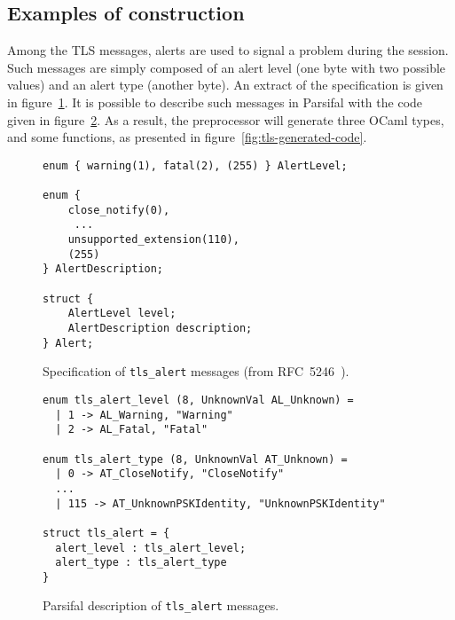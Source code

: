 \documentclass{article}
\begin{document}
\subsection{Examples of construction}

Among the TLS messages, alerts are used to signal a problem during the
session. Such messages are simply composed of an alert level (one byte
with two possible values) and an alert type (another byte). An extract
of the specification is given in figure~\ref{fig:tls-spec}. It is
possible to describe such messages in Parsifal with the code given in
figure~\ref{fig:tls-descr}. As a result, the preprocessor will
generate three OCaml types, and some functions, as presented in
figure~\ref{fig:tls-generated-code}.


\begin{figure}[p]
  \begin{center}\begin{minipage}{.32\linewidth}
    {\scriptsize
    \begin{verbatim}
enum { warning(1), fatal(2), (255) } AlertLevel;

enum {
    close_notify(0),
     ...
    unsupported_extension(110),
    (255)
} AlertDescription;

struct {
    AlertLevel level;
    AlertDescription description;
} Alert;
    \end{verbatim}}
  \end{minipage}\end{center}
  \caption{Specification of \texttt{tls\_alert} messages (from RFC~5246~\cite{rfc5246}).}
  \label{fig:tls-spec}
\end{figure}



\begin{figure}[p]
  \begin{center}\begin{minipage}{.52\linewidth}
    \begin{lstlisting}
enum tls_alert_level (8, UnknownVal AL_Unknown) =
  | 1 -> AL_Warning, "Warning"
  | 2 -> AL_Fatal, "Fatal"

enum tls_alert_type (8, UnknownVal AT_Unknown) =
  | 0 -> AT_CloseNotify, "CloseNotify"
  ...
  | 115 -> AT_UnknownPSKIdentity, "UnknownPSKIdentity"

struct tls_alert = {
  alert_level : tls_alert_level;
  alert_type : tls_alert_type
}
    \end{lstlisting}
  \end{minipage}\end{center}
  \caption{Parsifal description of \texttt{tls\_alert} messages.}
  \label{fig:tls-descr}
\end{figure}
\end{document}
